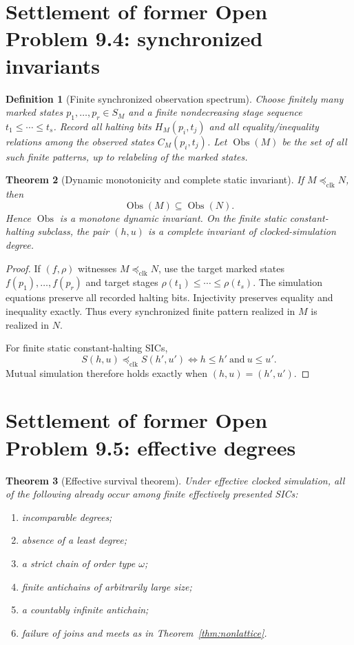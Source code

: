 \documentclass[11pt]{article}
\newtheorem{definition}{Definition}[section]
\newtheorem{theorem}[definition]{Theorem}
\theoremstyle{remark}
\newcommand{\preclk}{\preceq_{\mathrm{clk}}}
\newcommand{\Obs}{\operatorname{Obs}}
\begin{document}
\section{Settlement of former Open Problem 9.4: synchronized invariants}

\begin{definition}[Finite synchronized observation spectrum]
Choose finitely many marked states \(p_1,\dots,p_r\in S_M\) and a finite nondecreasing stage sequence
\(t_1\le\cdots\le t_s\).
Record all halting bits \(H_M(p_i,t_j)\) and all equality/inequality relations among the observed states
\(C_M(p_i,t_j)\).
Let \(\Obs(M)\) be the set of all such finite patterns, up to relabeling of the marked states.
\end{definition}

\begin{theorem}[Dynamic monotonicity and complete static invariant]\label{thm:obs}
If \(M\preclk N\), then
\[
\Obs(M)\subseteq\Obs(N).
\]
Hence \(\Obs\) is a monotone dynamic invariant.
On the finite static constant-halting subclass, the pair \((h,u)\) is a complete invariant of
clocked-simulation degree.
\end{theorem}

\begin{proof}
If \((f,\rho)\) witnesses \(M\preclk N\), use the target marked states
\(f(p_1),\dots,f(p_r)\) and target stages
\(\rho(t_1)\le\cdots\le\rho(t_s)\).
The simulation equations preserve all recorded halting bits.
Injectivity preserves equality and inequality exactly.
Thus every synchronized finite pattern realized in \(M\) is realized in \(N\).

For finite static constant-halting SICs,
\[
S(h,u)\preclk S(h',u')
\iff
h\le h'\ \text{and}\ u\le u'.
\]
Mutual simulation therefore holds exactly when \((h,u)=(h',u')\).
\end{proof}

\section{Settlement of former Open Problem 9.5: effective degrees}

\begin{theorem}[Effective survival theorem]\label{thm:effective-survival}
Under effective clocked simulation, all of the following already occur among finite effectively
presented SICs:
\begin{enumerate}[label=(\roman*)]
\item incomparable degrees;
\item absence of a least degree;
\item a strict chain of order type \(\omega\);
\item finite antichains of arbitrarily large size;
\item a countably infinite antichain;
\item failure of joins and meets as in Theorem~\ref{thm:nonlattice}.
\end{enumerate}
\end{theorem}
\end{document}
